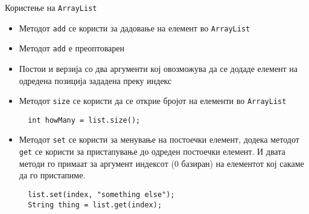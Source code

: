 \begin{frame}[fragile]{Користење на \texttt{ArrayList}}
\begin{itemize}
  \item Методот \texttt{add} се користи за дадовање на елемент во
  \texttt{ArrayList}
  \item Методот \texttt{add} е преоптоварен
  \item Постои и верзија со два аргументи кој овозможува да се додаде
  елемент на одредена позиција зададена преку индекс
  \item Методот \texttt{size} се користи да се открие бројот на елементи во \texttt{ArrayList}
  \begin{lstlisting}
  int howMany = list.size();
  \end{lstlisting}
  \item Методот \texttt{set} се користи за менување на постоечки елемент, додека
  методот \texttt{get} се користи за пристапување до одреден постоечки елемент.
  И двата методи го примаат за аргумент индексот (0 базиран) на елементот кој
  сакаме да го пристапиме.
  \begin{lstlisting}
  list.set(index, "something else");
  String thing = list.get(index);
  \end{lstlisting}
\end{itemize}
\end{frame}


